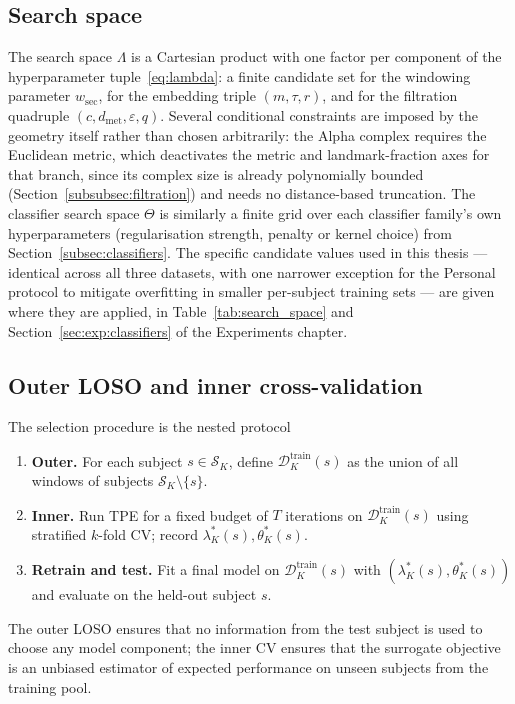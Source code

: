 \documentclass[onluarkali,ingilizce,yukseklisans,karton,LisansustuEgitim]{itutez}
\providecommand{\1}{\mathbf{1}}
\providecommand{\Sset}{\mathcal{S}}
\begin{document}
\subsection{Search space}
\label{subsubsec:bayes-search-space}

The search space $\Lambda$ is a Cartesian product with one factor per component of the hyperparameter tuple~\eqref{eq:lambda}: a finite candidate set for the windowing parameter $w_{\mathrm{sec}}$, for the embedding triple $(m,\tau,r)$, and for the filtration quadruple $(c,d_{\mathrm{met}},\varepsilon,q)$. Several conditional constraints are imposed by the geometry itself rather than chosen arbitrarily: the Alpha complex requires the Euclidean metric, which deactivates the metric and landmark-fraction axes for that branch, since its complex size is already polynomially bounded (Section~\ref{subsubsec:filtration}) and needs no distance-based truncation. The classifier search space $\Theta$ is similarly a finite grid over each classifier family's own hyperparameters (regularisation strength, penalty or kernel choice) from Section~\ref{subsec:classifiers}. The specific candidate values used in this thesis --- identical across all three datasets, with one narrower exception for the Personal protocol to mitigate overfitting in smaller per-subject training sets --- are given where they are applied, in Table~\ref{tab:search_space} and Section~\ref{sec:exp:classifiers} of the Experiments chapter.

\subsection{Outer LOSO and inner cross-validation}
\label{subsubsec:nested-cv}

The selection procedure is the nested protocol
\begin{enumerate}[label=(\arabic*)]
  \item \textbf{Outer.} For each subject $s\in\Sset_K$, define $\mathcal{D}^{\mathrm{train}}_K(s)$ as the union of all windows of subjects $\Sset_K\setminus\{s\}$.
  \item \textbf{Inner.} Run TPE for a fixed budget of $T$ iterations on $\mathcal{D}^{\mathrm{train}}_K(s)$ using stratified $k$-fold CV; record $\lambda^*_K(s),\theta^*_K(s)$.
  \item \textbf{Retrain and test.} Fit a final model on $\mathcal{D}^{\mathrm{train}}_K(s)$ with $(\lambda^*_K(s),\theta^*_K(s))$ and evaluate on the held-out subject $s$.
\end{enumerate}
The outer LOSO ensures that no information from the test subject is used to choose any model component; the inner CV ensures that the surrogate objective is an unbiased estimator of expected performance on unseen subjects from the training pool.
\end{document}
